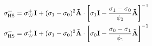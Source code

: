 \begin{equation}
\begin{split}
\sigma_{\rm HS}^{+} &= \sigma_W^{+} \mathbf{I} + (\sigma_1 - \sigma_0)^2 \mathbf{\tilde{A}} \cdot
\left[\sigma_1\mathbf{I} + \frac{\sigma_1 - \sigma_0}{\phi_0}\mathbf{\tilde{A}}\right]^{-1}\\
\sigma_{\rm HS}^{-} &= \sigma_W^{+} \mathbf{I} + (\sigma_1 - \sigma_0)^2 \mathbf{\tilde{A}} \cdot
\left[\sigma_0\mathbf{I} + \frac{\sigma_0 - \sigma_1}{\phi_1}\mathbf{\tilde{A}}\right]^{-1}
\end{split}
\label{eq:hashin_shtrikman_bounds_anisotropic}
\end{equation}
